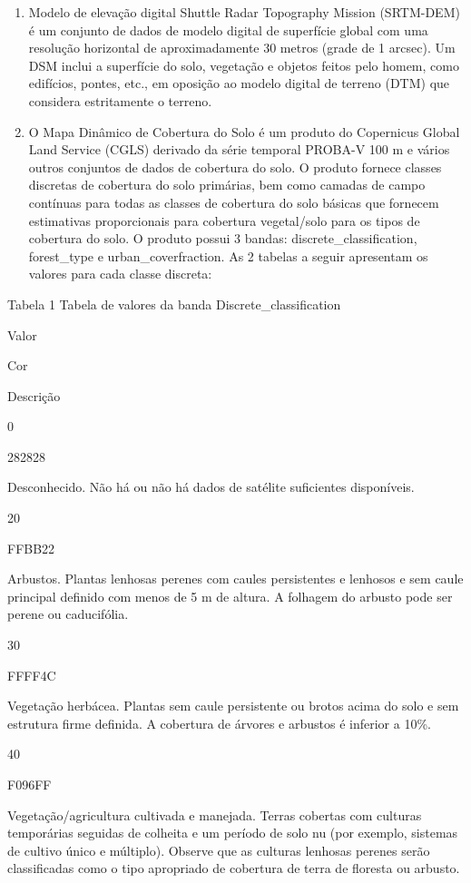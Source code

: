 \documentclass[
]{book}
\begin{document}
\begin{enumerate}
\def\labelenumi{\arabic{enumi}.}
\item
  Modelo de elevação digital Shuttle Radar Topography Mission (SRTM-DEM) é um conjunto de dados de modelo digital de superfície global com uma resolução horizontal de aproximadamente 30 metros (grade de 1 arcsec). Um DSM inclui a superfície do solo, vegetação e objetos feitos pelo homem, como edifícios, pontes, etc., em oposição ao modelo digital de terreno (DTM) que considera estritamente o terreno.
\item
  O Mapa Dinâmico de Cobertura do Solo é um produto do Copernicus Global Land Service (CGLS) derivado da série temporal PROBA-V 100 m e vários outros conjuntos de dados de cobertura do solo. O produto fornece classes discretas de cobertura do solo primárias, bem como camadas de campo contínuas para todas as classes de cobertura do solo básicas que fornecem estimativas proporcionais para cobertura vegetal/solo para os tipos de cobertura do solo. O produto possui 3 bandas: discrete\_classification, forest\_type e urban\_coverfraction. As 2 tabelas a seguir apresentam os valores para cada classe discreta:
\end{enumerate}

Tabela 1 Tabela de valores da banda Discrete\_classification

Valor

Cor

Descrição

0

282828

Desconhecido. Não há ou não há dados de satélite suficientes disponíveis.

20

FFBB22

Arbustos. Plantas lenhosas perenes com caules persistentes e lenhosos e sem caule principal definido com menos de 5 m de altura. A folhagem do arbusto pode ser perene ou caducifólia.

30

FFFF4C

Vegetação herbácea. Plantas sem caule persistente ou brotos acima do solo e sem estrutura firme definida. A cobertura de árvores e arbustos é inferior a 10\%.

40

F096FF

Vegetação/agricultura cultivada e manejada. Terras cobertas com culturas temporárias seguidas de colheita e um período de solo nu (por exemplo, sistemas de cultivo único e múltiplo). Observe que as culturas lenhosas perenes serão classificadas como o tipo apropriado de cobertura de terra de floresta ou arbusto.
\end{document}
